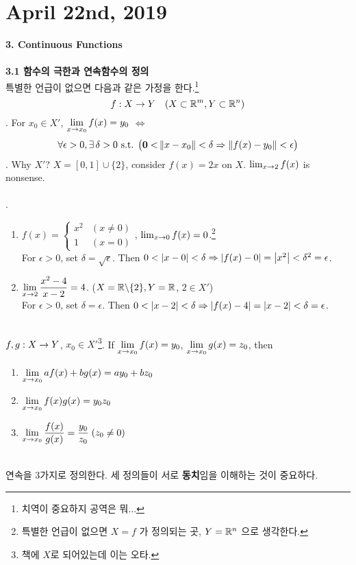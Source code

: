 \section*{April 22nd, 2019}
\textbf{\large 3. Continuous Functions}\\
\\
\textbf{3.1 함수의 극한과 연속함수의 정의}\\
특별한 언급이 없으면 다음과 같은 가정을 한다.\footnote{치역이 중요하지 공역은 뭐...} $$f:X\rightarrow Y \quad ( X\subset \mathbb{R}^m, Y\subset \mathbb{R}^n )$$
. For $x_0\in X'$, $\displaystyle \lim_{x\rightarrow x_0} f(x) = y_0$ $\iff$ $$\forall \epsilon >0, \exists\, \delta > 0 \text{ s.t. } \big(\mathbf{0 <} \left\lVert x-x_0\right\rVert < \delta \Rightarrow \left\lVert f(x) - y_0\right\rVert < \epsilon\big)$$
\rmk. Why $X'$? $X = [0, 1]\cup \{2\}$, consider $f(x) = 2x$ on $X$. $\lim_{x\rightarrow 2} f(x)$ is nonsense.\\
\\
\ex.
\begin{enumerate}
	\item $f(x)=\begin{cases}
		x^2 & (x\neq 0)\\ 1 & (x = 0)
	\end{cases}$, $\lim_{x\rightarrow 0} f(x) = 0$.\footnote{특별한 언급이 없으면 $X = f$ 가 정의되는 곳, $Y = \mathbb{R}^n$ 으로 생각한다.}\\
	For $\epsilon >0$, set $\delta = \sqrt{\epsilon}$. Then $0 < \left|x - 0\right| < \delta \Rightarrow \left|f(x) - 0\right| = \left|x^2\right| < \delta^2 = \epsilon$.
	\item $\displaystyle \lim_{x\rightarrow 2} \frac{x^2-4}{x-2} =4$. ($X = \mathbb{R}\backslash \{2\}, Y = \mathbb{R}$, $2 \in X'$)\\
	For $\epsilon > 0$, set $\delta = \epsilon$. Then $0<\left|x - 2\right| < \delta \Rightarrow \left|f(x) - 4\right| = \left|x -2\right| < \delta = \epsilon$.
\end{enumerate}~\\
 $f, g: X\rightarrow Y$, $x_0\in X'$\footnote{책에 $X$로 되어있는데 이는 오타.}. If $\displaystyle \lim_{x\rightarrow x_0} f(x) = y_0$, $\displaystyle \lim_{x\rightarrow x_0} g(x) = z_0$, then
\begin{enumerate}
	\item $\displaystyle \lim_{x\rightarrow x_0} af(x) + bg(x) = ay_0+bz_0$
	\item $\displaystyle \lim_{x\rightarrow x_0} f(x)g(x) = y_0z_0$
	\item $\displaystyle \lim_{x\rightarrow x_0} \frac{f(x)}{g(x)} = \frac{y_0}{z_0} \;(z_0\neq 0)$
\end{enumerate}~\\
연속을 3가지로 정의한다. 세 정의들이 서로 \textbf{동치}임을 이해하는 것이 중요하다.\\
